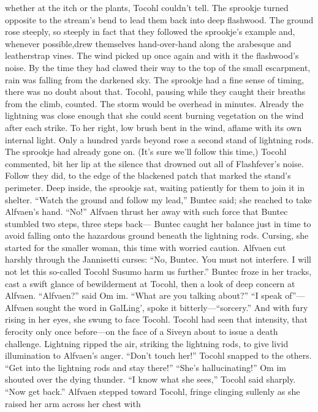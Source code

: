 \documentclass[9pt]{article}
\begin{document}
whether at the itch or the plants, Tocohl couldn’t tell.
The sprookje turned opposite to the stream’s bend to lead them back into deep flashwood. The
ground rose steeply, so steeply in fact that they followed the sprookje’s example and, whenever possible,drew themselves hand-over-hand along the arabesque and leatherstrap vines.
The wind picked up once again and with it the flashwood’s noise. By the time they had clawed their
way to the top of the small escarpment, rain was falling from the darkened sky. The sprookje had a fine
sense of timing, there was no doubt about that. Tocohl, pausing while they caught their breaths from the
climb, counted. The storm would be overhead in minutes. Already the lightning was close enough that she
could scent burning vegetation on the wind after each strike.
To her right, low brush bent in the wind, aflame with its own internal light. Only a hundred yards
beyond rose a second stand of lightning rods. The sprookje had already gone on. (It’s sure we’ll follow
this time,) Tocohl commented, bit her lip at the silence that drowned out all of Flashfever’s noise.
Follow they did, to the edge of the blackened patch that marked the stand’s perimeter. Deep inside,
the sprookje sat, waiting patiently for them to join it in shelter.
“Watch the ground and follow my lead,” Buntec said; she reached to take Alfvaen’s hand.
“No!” Alfvaen thrust her away with such force that Buntec stumbled two steps, three steps back—
Buntec caught her balance just in time to avoid falling onto the hazardous ground beneath the lightning
rods. Cursing, she started for the smaller woman, this time with worried caution.
Alfvaen cut harshly through the Jannisetti curses: “No, Buntec. You must not interfere. I will not let
this so-called Tocohl Susumo harm us further.”
Buntec froze in her tracks, cast a swift glance of bewilderment at Tocohl, then a look of deep
concern at Alfvaen.
“Alfvaen?” said Om im. “What are you talking about?”
“I speak of”—Alfvaen sought the word in GalLing’, spoke it bitterly—“sorcery.” And with fury rising
in her eyes, she swung to face Tocohl.
Tocohl had seen that intensity, that ferocity only once before—on the face of a Siveyn about to issue
a death challenge. Lightning ripped the air, striking the lightning rods, to give livid illumination to Alfvaen’s
anger.
“Don’t touch her!” Tocohl snapped to the others. “Get into the lightning rods and stay there!”
“She’s hallucinating!” Om im shouted over the dying thunder.
“I know what she sees,” Tocohl said sharply. “Now get back.”
Alfvaen stepped toward Tocohl, fringe clinging sullenly as she raised her arm across her chest with
\end{document}
